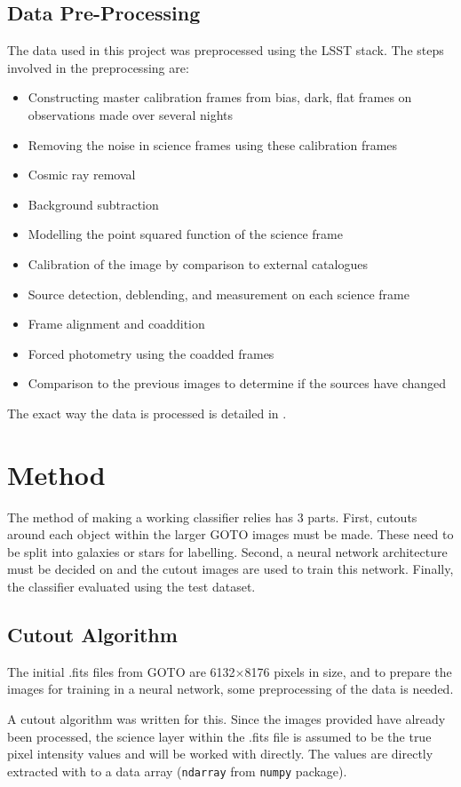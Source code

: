 \documentclass[a4paper,fleqn,usenatbib]{mnras}
\begin{document}
\subsection{Data Pre-Processing}
The data used in this project was preprocessed using the LSST stack. The steps involved in the preprocessing are:
\begin{itemize}
\item Constructing master calibration frames from bias, dark, flat frames on observations made over several nights
\item Removing the noise in science frames using these calibration frames
\item Cosmic ray removal
\item Background subtraction
\item Modelling the point squared function of the science frame
\item Calibration of the image by comparison to external catalogues
\item Source detection, deblending, and measurement on each science frame
\item Frame alignment and coaddition
\item Forced photometry using the coadded frames
\item Comparison to the previous images to determine if the sources have changed
\end{itemize}

The exact way the data is processed is detailed in \citet{LSST} \citet{GOTOLSST}.


 \section{Method}
The method of making a working classifier relies has 3 parts. First, cutouts around each object within the larger GOTO images must be made. These need to be split into galaxies or stars for labelling. Second, a neural network architecture must be decided on and the cutout images are used to train this network. Finally, the classifier evaluated using the test dataset.
\subsection{Cutout Algorithm}
The initial .fits files from GOTO are 6132$\times$8176 pixels in size, and to prepare the images for training in a neural network, some preprocessing of the data is needed. 

A cutout algorithm was written for this. Since the images provided have already been processed, the science layer within the .fits file is assumed to be the true pixel intensity values and will be worked with directly. The values are directly extracted with to a data array (\texttt{ndarray} from \texttt{numpy} package).
\end{document}
